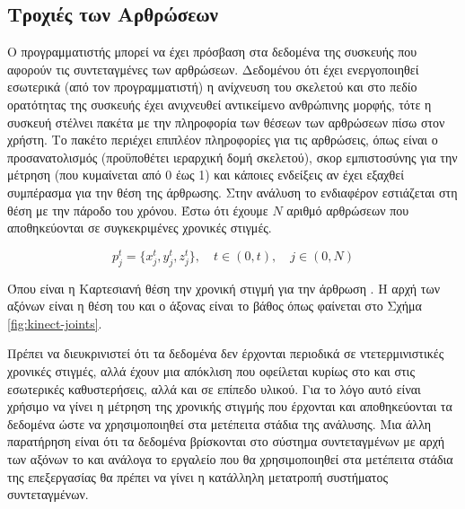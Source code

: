 \subsection{Τροχιές των Αρθρώσεων}

Ο προγραμματιστής  μπορεί να έχει πρόσβαση στα δεδομένα της συσκευής που αφορούν τις συντεταγμένες των αρθρώσεων. Δεδομένου ότι έχει ενεργοποιηθεί εσωτερικά (από τον προγραμματιστή) η ανίχνευση του σκελετού και στο πεδίο ορατότητας της συσκευής έχει ανιχνευθεί αντικείμενο ανθρώπινης μορφής, τότε η συσκευή στέλνει πακέτα με την πληροφορία των θέσεων των αρθρώσεων πίσω στον χρήστη. Το πακέτο περιέχει επιπλέον πληροφορίες για τις αρθρώσεις, όπως είναι ο προσανατολισμός (προϋποθέτει ιεραρχική δομή σκελετού), σκορ εμπιστοσύνης για την μέτρηση (που κυμαίνεται από 0 έως 1) και κάποιες ενδείξεις αν έχει εξαχθεί συμπέρασμα για την θέση της άρθρωσης. Στην ανάλυση το ενδιαφέρον εστιάζεται στη θέση με την πάροδο του χρόνου. Έστω ότι έχουμε $Ν$ αριθμό αρθρώσεων που αποθηκεύονται σε συγκεκριμένες χρονικές στιγμές.

\begin{equation}
    p^{t}_{j} = \{x^{t}_{j}, y^{t}_{j}, z^{t}_{j}\}, \quad t \in (0, t), \quad j \in (0, N)
    \label{equ:trajectories}
\end{equation}

Όπου  είναι η Καρτεσιανή θέση την χρονική στιγμή  για την άρθρωση . Η αρχή των αξόνων είναι η θέση του  και ο άξονας  είναι το βάθος όπως φαίνεται στο Σχήμα \ref{fig:kinect-joints}.

Πρέπει να διευκρινιστεί ότι τα δεδομένα δεν έρχονται περιοδικά σε ντετερμινιστικές χρονικές στιγμές, αλλά έχουν μια απόκλιση που οφείλεται κυρίως στο  και στις εσωτερικές καθυστερήσεις, αλλά και σε επίπεδο υλικού. Για το λόγο αυτό είναι χρήσιμο να γίνει η μέτρηση της χρονικής στιγμής που έρχονται και αποθηκεύονται τα δεδομένα ώστε να χρησιμοποιηθεί στα μετέπειτα στάδια της ανάλυσης. Μια άλλη παρατήρηση είναι ότι τα δεδομένα βρίσκονται στο σύστημα συντεταγμένων με αρχή των αξόνων το  και ανάλογα το εργαλείο που θα χρησιμοποιηθεί στα μετέπειτα στάδια της επεξεργασίας θα πρέπει να γίνει η κατάλληλη μετατροπή συστήματος συντεταγμένων.

